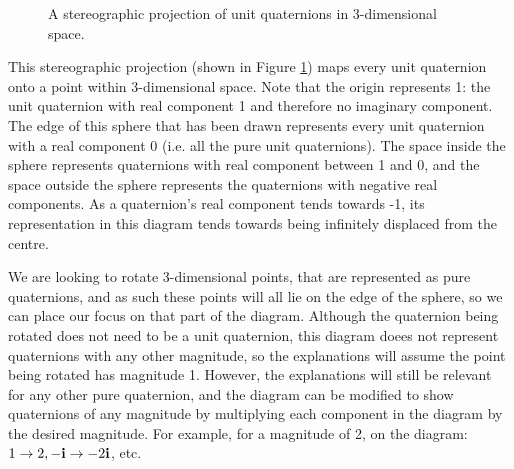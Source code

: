 \documentclass[10pt]{article}
\begin{document}
\begin{figure}[ht]
    \centering
    \caption{A stereographic projection of unit quaternions in 3-dimensional space. \cite{Penguin}}
    \label{SterographicFig}
\end{figure}

This stereographic projection (shown in Figure \ref{SterographicFig}) maps every unit quaternion onto a point within 3-dimensional space. Note that the origin represents 1: the unit quaternion with real component 1 and therefore no imaginary component. The edge of this sphere that has been drawn represents every unit quaternion with a real component 0 (i.e. all the pure unit quaternions). The space inside the sphere represents quaternions with real component between 1 and 0, and the space outside the sphere represents the quaternions with negative real components. As a quaternion's real component tends towards -1, its representation in this diagram tends towards being infinitely displaced from the centre.

We are looking to rotate 3-dimensional points, that are represented as pure quaternions, and as such these points will all lie on the edge of the sphere, so we can place our focus on that part of the diagram. Although the quaternion being rotated does not need to be a unit quaternion, this diagram doees not represent quaternions with any other magnitude, so the explanations will assume the point being rotated has magnitude 1. However, the explanations will still be relevant for any other pure quaternion, and the diagram can be modified to show quaternions of any magnitude by multiplying each component in the diagram by the desired magnitude. For example, for a magnitude of 2, on the diagram: $1 \rightarrow 2, -\vb{i} \rightarrow -2\vb{i}$, etc.
\end{document}
